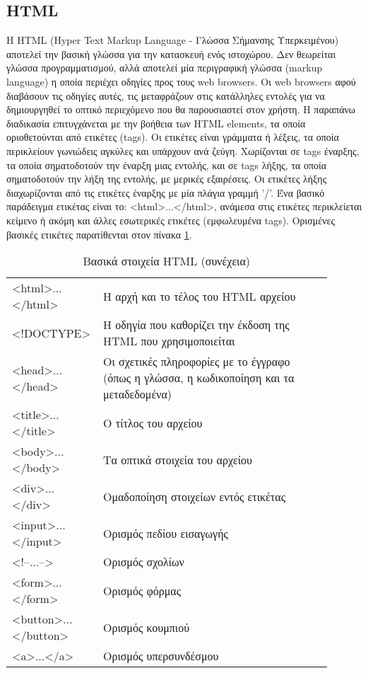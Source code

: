 \subsection{HTML}
Η HTML (Hyper Text Markup Language - Γλώσσα Σήμανσης Υπερκειμένου) αποτελεί την βασική γλώσσα για την κατασκευή ενός ιστοχώρου. Δεν θεωρείται γλώσσα προγραμματισμού, αλλά αποτελεί μία περιγραφική γλώσσα (markup language) η οποία περιέχει οδηγίες προς τους web browsers. Οι web browsers αφού διαβάσουν τις οδηγίες αυτές, τις μεταφράζουν στις κατάλληλες εντολές για να δημιουργηθεί το οπτικό περιεχόμενο που θα παρουσιαστεί στον χρήστη. Η παραπάνω διαδικασία επιτυγχάνεται με την βοήθεια των HTML elements, τα οποία οριοθετούνται από ετικέτες (tags). Οι ετικέτες είναι γράμματα ή λέξεις, τα οποία περικλείουν γωνιώδεις αγκύλες και υπάρχουν ανά ζεύγη. Χωρίζονται σε tags έναρξης, τα οποία σηματοδοτούν την έναρξη μιας εντολής, και σε tags λήξης, τα οποία σηματοδοτούν την λήξη της εντολής, με μερικές εξαιρέσεις. Οι ετικέτες λήξης διαχωρίζονται από τις ετικέτες έναρξης με μία πλάγια γραμμή '/'. Ένα βασικό παράδειγμα ετικέτας είναι το: <html>...</html>, ανάμεσα στις ετικέτες περικλείεται κείμενο ή ακόμη και άλλες εσωτερικές ετικέτες (εμφωλευμένα tags). Ορισμένες βασικές ετικέτες παρατίθενται στον πίνακα \ref{tbl:html_basic_elements}.

\begin{longtable}{|p{0.2\linewidth}|p{0.7\linewidth}|} 
	\caption{Βασικά στοιχεία HTML} \label{tbl:html_basic_elements} \\
	\hline
	\endfirsthead
	\caption[{}]{Βασικά στοιχεία HTML (συνέχεια)} \\ 
	\endhead \endfoot 
	\textless{}html\textgreater{}...\textless{}/html\textgreater{} & Η αρχή και το τέλος του HTML αρχείου \\ \hline
	\textless{}!DOCTYPE\textgreater{} & Η οδηγία που καθορίζει την έκδοση της HTML που χρησιμοποιείται \\ \hline
	\textless{}head\textgreater{}...\textless{}/head\textgreater{} & Οι σχετικές πληροφορίες με το έγγραφο (όπως η γλώσσα, η κωδικοποίηση και τα μεταδεδομένα) \\ \hline
	\textless{}title\textgreater{}...\textless{}/title\textgreater{} & Ο τίτλος του αρχείου \\ \hline
	\textless{}body\textgreater{}...\textless{}/body\textgreater{} & Τα οπτικά στοιχεία του αρχείου \\ \hline
	\textless{}div\textgreater{}...\textless{}/div\textgreater{} & Ομαδοποίηση στοιχείων εντός ετικέτας \\ \hline
	\textless{}input\textgreater{}...\textless{}/input\textgreater{} & Ορισμός πεδίου εισαγωγής \\ \hline
	\textless{}!--...--\textgreater{} & Ορισμός σχολίων \\ \hline
	\textless{}form\textgreater{}...\textless{}/form\textgreater{} & Ορισμός φόρμας \\ \hline
	\textless{}button\textgreater{}...\textless{}/button\textgreater{} & Ορισμός κουμπιού \\ \hline
	\textless{}a\textgreater{}...\textless{}/a\textgreater{} & Ορισμός υπερσυνδέσμου \\ \hline
\end{longtable}

